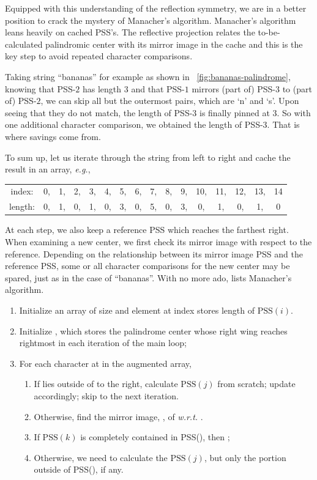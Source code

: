 Equipped with this understanding of the reflection symmetry, we are in a better position to
crack the mystery of Manacher's algorithm.
Manacher's algorithm leans heavily on cached PSS's.
The reflective projection relates the to-be-calculated palindromic center with its mirror image in
the cache and this is the key step to avoid repeated character comparisons.

Taking string ``bananas'' for example as shown in ~\autoref{fig:bananas-palindrome},
knowing that PSS-$2$ has length $3$ and that PSS-$1$ mirrors (part of) PSS-$3$ to (part of)
PSS-$2$, we can skip all but the outermost pairs, which are `n' and `s'.
Upon seeing that they do not match, the length of PSS-$3$ is finally pinned at $3$.
So with one additional character comparison, we obtained the length of PSS-$3$.
That is where savings come from.


To sum up, let us iterate through the string from left to right and cache the result in an array,
\textit{e.g.},
\begin{center}
    \begin{tabular}{cccccccccccccccc}
        index:&0,&1,&2,&3,&4,&5,&6,&7,&8,&9,&10,&11,&12,&13,&14\\
        length:&0,&1,&0,&1,&0,&3,&0,&5,&0,&3,&0,&1,&0,&1,&0
    \end{tabular}
\end{center}
At each step, we also keep a reference PSS which reaches the farthest right.
When examining a new center, we first check its mirror image with respect to the
reference.
Depending on the relationship between its mirror image PSS and the reference PSS,
some or all character comparisons for the new center may be spared, just as in the case of
``bananas''.
With no more ado, lists Manacher's algorithm.
\begin{enumerate}
    \item Initialize an array  of size  and element at index 
    stores length of $\mbox{PSS}(i)$.
    \item Initialize , which stores the palindrome center whose right wing
    reaches rightmost in each iteration of the main loop;
    \item For each character at  in the augmented array,
    \begin{enumerate}[label={\roman*:}]
        \item If  lies outside of  to the right,
        calculate $\mbox{PSS}(j)$ from scratch;
        update  accordingly;
        skip to the next iteration.
        \item Otherwise, find the mirror image, , of 
        \textit{w.r.t.} .
        \item If $\mbox{PSS}(k)$ is completely contained in \mbox{PSS()},
        then ;
        \item Otherwise, we need to calculate the $\mbox{PSS}(j)$, but only the portion
        outside of \mbox{PSS()}, if any.
    \end{enumerate}
\end{enumerate}


